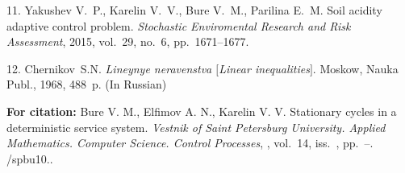 {11.   Yakushev V.~P., Karelin V.~V., Bure V.~M., Parilina E.~M.
 Soil acidity adaptive control problem.
{\it Stochastic Enviromental Research and Risk Assessment}, 2015,
vol.~29, no.~6,  pp.~1671--1677.

12.    Chernikov~S.\:N. {\it Lineynye neravenstva $[$Linear
inequalities$]$}. Moskow, Nauka Publ., 1968, 488~p. (In Russian)




\vskip 2mm

{\bf For citation:} Bure V. M., Elfimov  A. N., Karelin V. V.
Stationary cycles in a deterministic service system. {\it Vestnik
of Saint Petersburg University. Applied Mathematics. Computer
Science. Control Processes}, \issueyear, vol.~14, iss.~\issuenum,
pp.~\pageref{p5}--\pageref{p5e}.
\doivyp/spbu10.\issueyear.


}
